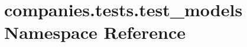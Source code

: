 \hypertarget{namespacecompanies_1_1tests_1_1test__models}{\section{companies.\-tests.\-test\-\_\-models Namespace Reference}
\label{namespacecompanies_1_1tests_1_1test__models}
}

